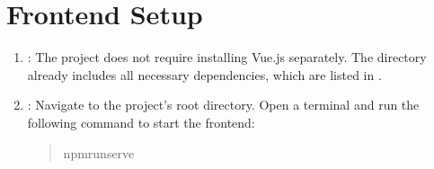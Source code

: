 \documentclass[a4paper,12pt,english]{sphinxmanual}
\begin{document}
\section{Front\sphinxhyphen{}end Setup}
\label{\detokenize{user/installation:front-end-setup}}\begin{enumerate}
%
\item {} 
\sphinxAtStartPar
{}:
The project does not require installing Vue.js separately. The  directory already includes all necessary dependencies, which are listed in .

\item {} 
\sphinxAtStartPar
{}:
\sphinxhyphen{} Navigate to the project’s root directory.
\sphinxhyphen{} Open a terminal and run the following command to start the front\sphinxhyphen{}end:
\begin{quote}

\begin{sphinxVerbatim}[commandchars=\\\{\}]
npmrunserve
\end{sphinxVerbatim}
\end{quote}

\end{enumerate}
\end{document}
